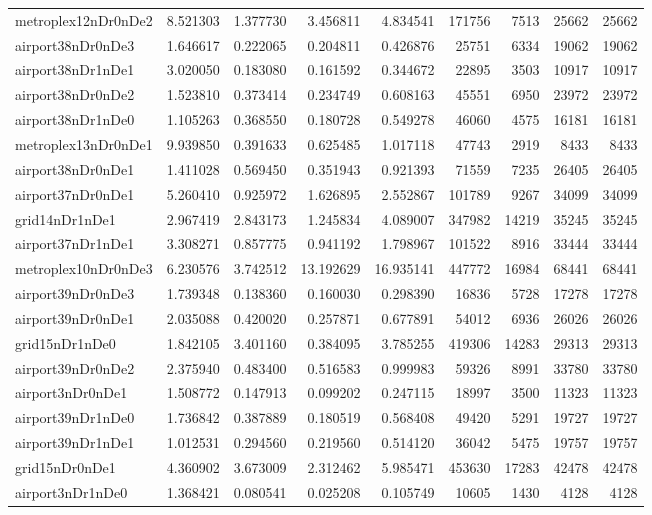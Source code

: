 \begin{longtable}{|l|r|r|r|r|r|r|r|r|}
metroplex12nDr0nDe2 & 8.521303 & 1.377730 & 3.456811 & 4.834541 & 171756 & 7513 & 25662 & 25662 \\
airport38nDr0nDe3 & 1.646617 & 0.222065 & 0.204811 & 0.426876 & 25751 & 6334 & 19062 & 19062 \\
airport38nDr1nDe1 & 3.020050 & 0.183080 & 0.161592 & 0.344672 & 22895 & 3503 & 10917 & 10917 \\
airport38nDr0nDe2 & 1.523810 & 0.373414 & 0.234749 & 0.608163 & 45551 & 6950 & 23972 & 23972 \\
airport38nDr1nDe0 & 1.105263 & 0.368550 & 0.180728 & 0.549278 & 46060 & 4575 & 16181 & 16181 \\
metroplex13nDr0nDe1 & 9.939850 & 0.391633 & 0.625485 & 1.017118 & 47743 & 2919 & 8433 & 8433 \\
airport38nDr0nDe1 & 1.411028 & 0.569450 & 0.351943 & 0.921393 & 71559 & 7235 & 26405 & 26405 \\
airport37nDr0nDe1 & 5.260410 & 0.925972 & 1.626895 & 2.552867 & 101789 & 9267 & 34099 & 34099 \\
grid14nDr1nDe1 & 2.967419 & 2.843173 & 1.245834 & 4.089007 & 347982 & 14219 & 35245 & 35245 \\
airport37nDr1nDe1 & 3.308271 & 0.857775 & 0.941192 & 1.798967 & 101522 & 8916 & 33444 & 33444 \\
metroplex10nDr0nDe3 & 6.230576 & 3.742512 & 13.192629 & 16.935141 & 447772 & 16984 & 68441 & 68441 \\
airport39nDr0nDe3 & 1.739348 & 0.138360 & 0.160030 & 0.298390 & 16836 & 5728 & 17278 & 17278 \\
airport39nDr0nDe1 & 2.035088 & 0.420020 & 0.257871 & 0.677891 & 54012 & 6936 & 26026 & 26026 \\
grid15nDr1nDe0 & 1.842105 & 3.401160 & 0.384095 & 3.785255 & 419306 & 14283 & 29313 & 29313 \\
airport39nDr0nDe2 & 2.375940 & 0.483400 & 0.516583 & 0.999983 & 59326 & 8991 & 33780 & 33780 \\
airport3nDr0nDe1 & 1.508772 & 0.147913 & 0.099202 & 0.247115 & 18997 & 3500 & 11323 & 11323 \\
airport39nDr1nDe0 & 1.736842 & 0.387889 & 0.180519 & 0.568408 & 49420 & 5291 & 19727 & 19727 \\
airport39nDr1nDe1 & 1.012531 & 0.294560 & 0.219560 & 0.514120 & 36042 & 5475 & 19757 & 19757 \\
grid15nDr0nDe1 & 4.360902 & 3.673009 & 2.312462 & 5.985471 & 453630 & 17283 & 42478 & 42478 \\
airport3nDr1nDe0 & 1.368421 & 0.080541 & 0.025208 & 0.105749 & 10605 & 1430 & 4128 & 4128 \\

\end{longtable}

